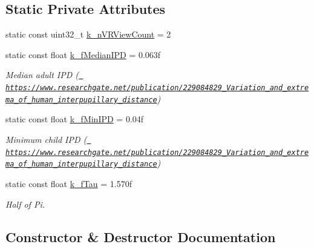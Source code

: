 \subsection*{Static Private Attributes}
\begin{DoxyCompactItemize}
\item 
static const uint32\+\_\+t \mbox{\hyperlink{class_open_x_r_provider_1_1_x_r_render_manager_ac45e255445709b7418be38ee9adee932}{k\+\_\+n\+V\+R\+View\+Count}} = 2
\item 
static const float \mbox{\hyperlink{class_open_x_r_provider_1_1_x_r_render_manager_af3050f786bada6f0b3e2416bed3b873f}{k\+\_\+f\+Median\+I\+PD}} = 0.\+063f
\begin{DoxyCompactList}\small\item\em Median adult I\+PD (\href{https://www.researchgate.net/publication/229084829_Variation_and_extrema_of_human_interpupillary_distance}{\texttt{ https\+://www.\+researchgate.\+net/publication/229084829\+\_\+\+Variation\+\_\+and\+\_\+extrema\+\_\+of\+\_\+human\+\_\+interpupillary\+\_\+distance}}) \end{DoxyCompactList}\item 
static const float \mbox{\hyperlink{class_open_x_r_provider_1_1_x_r_render_manager_a1c86c1472f94b8979d3d63291d2fdd19}{k\+\_\+f\+Min\+I\+PD}} = 0.\+04f
\begin{DoxyCompactList}\small\item\em Minimum child I\+PD (\href{https://www.researchgate.net/publication/229084829_Variation_and_extrema_of_human_interpupillary_distance}{\texttt{ https\+://www.\+researchgate.\+net/publication/229084829\+\_\+\+Variation\+\_\+and\+\_\+extrema\+\_\+of\+\_\+human\+\_\+interpupillary\+\_\+distance}}) \end{DoxyCompactList}\item 
static const float \mbox{\hyperlink{class_open_x_r_provider_1_1_x_r_render_manager_a9e8ffc6b08bd67c784bc45b572d1fb16}{k\+\_\+f\+Tau}} = 1.\+570f
\begin{DoxyCompactList}\small\item\em Half of Pi. \end{DoxyCompactList}\end{DoxyCompactItemize}


\subsection{Constructor \& Destructor Documentation}
\mbox{\label{class_open_x_r_provider_1_1_x_r_render_manager_a8ffc871639334f7e2cebfe41f2340b42}} 
